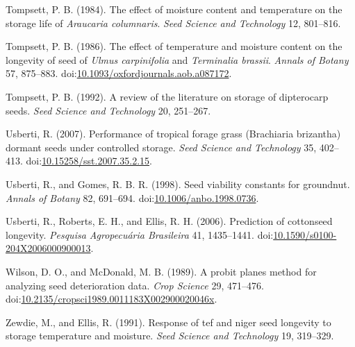 \documentclass[]{article}
\begin{document}
\leavevmode\hypertarget{ref-tompsett_effect_1984}{}%
Tompsett, P. B. (1984). The effect of moisture content and temperature
on the storage life of \emph{Araucaria columnaris}. \emph{Seed Science
and Technology} 12, 801--816.

\leavevmode\hypertarget{ref-tompsett_effect_1986}{}%
Tompsett, P. B. (1986). The effect of temperature and moisture content
on the longevity of seed of \emph{Ulmus carpinifolia} and
\emph{Terminalia brassii}. \emph{Annals of Botany} 57, 875--883.
doi:\href{https://doi.org/10.1093/oxfordjournals.aob.a087172}{10.1093/oxfordjournals.aob.a087172}.

\leavevmode\hypertarget{ref-tompsett_review_1992}{}%
Tompsett, P. B. (1992). A review of the literature on storage of
dipterocarp seeds. \emph{Seed Science and Technology} 20, 251--267.

\leavevmode\hypertarget{ref-usberti_performance_2007}{}%
Usberti, R. (2007). Performance of tropical forage grass (Brachiaria
brizantha) dormant seeds under controlled storage. \emph{Seed Science
and Technology} 35, 402--413.
doi:\href{https://doi.org/10.15258/sst.2007.35.2.15}{10.15258/sst.2007.35.2.15}.

\leavevmode\hypertarget{ref-usberti_seed_1998}{}%
Usberti, R., and Gomes, R. B. R. (1998). Seed viability constants for
groundnut. \emph{Annals of Botany} 82, 691--694.
doi:\href{https://doi.org/10.1006/anbo.1998.0736}{10.1006/anbo.1998.0736}.

\leavevmode\hypertarget{ref-usberti_prediction_2006}{}%
Usberti, R., Roberts, E. H., and Ellis, R. H. (2006). Prediction of
cottonseed longevity. \emph{Pesquisa Agropecuária Brasileira} 41,
1435--1441.
doi:\href{https://doi.org/10.1590/s0100-204X2006000900013}{10.1590/s0100-204X2006000900013}.

\leavevmode\hypertarget{ref-wilson_probit_1989}{}%
Wilson, D. O., and McDonald, M. B. (1989). A probit planes method for
analyzing seed deterioration data. \emph{Crop Science} 29, 471--476.
doi:\href{https://doi.org/10.2135/cropsci1989.0011183X002900020046x}{10.2135/cropsci1989.0011183X002900020046x}.

\leavevmode\hypertarget{ref-zewdie_response_1991}{}%
Zewdie, M., and Ellis, R. (1991). Response of tef and niger seed
longevity to storage temperature and moisture. \emph{Seed Science and
Technology} 19, 319--329.
\end{document}
